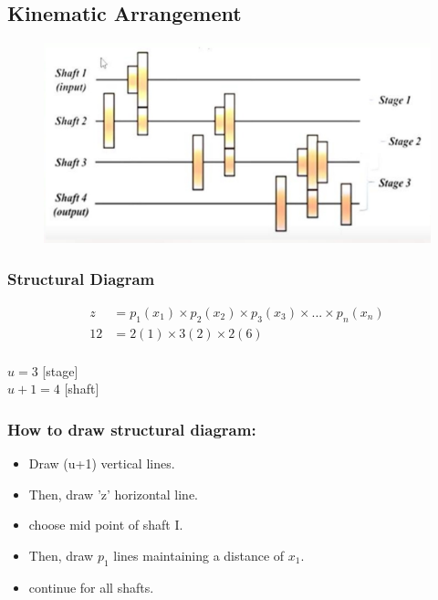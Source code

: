\documentclass{article}
\begin{document}
\begin{multicols*}{2}
  \subsection*{Kinematic Arrangement}
  \begin{figure}[H]
    \begin{center}
      \includegraphics[width=\columnwidth]{img/kinematic_arrangement.jpeg}
    \end{center}
  \end{figure}

  \subsubsection*{Structural Diagram}
  \begin{align*}
    z &= p_1 (x_1) \times p_2(x_2) \times p_3 (x_3) \times ... \times p_n (x_n) \\
    12 &= 2(1) \times 3(2) \times 2(6) \\
  \end{align*} 

  $u = 3$ [stage] \\
  $u + 1 = 4$ [shaft] \\

  \subsubsection*{How to draw structural diagram:}
  \begin{itemize}
    \item Draw (u+1) vertical lines. 
    \item Then, draw 'z' horizontal line. 
    \item choose mid point of shaft I.
    \item Then, draw $p_1$ lines maintaining a distance of $x_1$.
    \item continue for all shafts.
  \end{itemize}


\end{multicols*}
\end{document}

